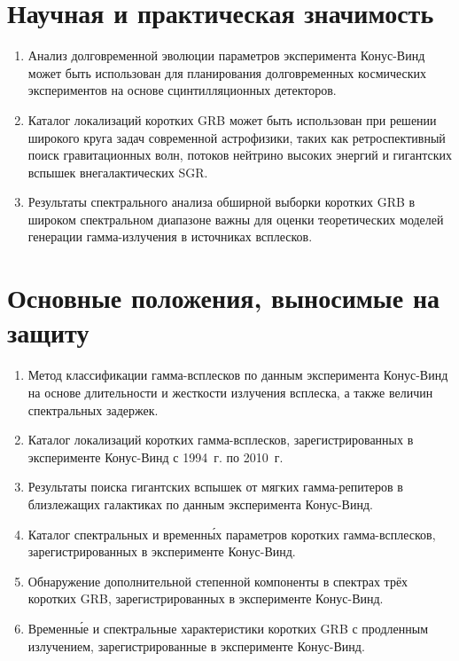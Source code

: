 \section*{Научная и практическая значимость}

\begin{enumerate}
\item Анализ долговременной эволюции параметров эксперимента Конус-Винд может быть использован
 для планирования долговременных космических экспериментов на основе сцинтилляционных детекторов.
\item Каталог локализаций коротких GRB может быть использован при решении 
 широкого круга задач современной астрофизики, таких как ретроспективный поиск гравитационных волн, потоков 
 нейтрино высоких энергий и гигантских вспышек внегалактических SGR.
\item Результаты спектрального анализа обширной выборки коротких GRB 
 в широком спектральном диапазоне важны для оценки теоретических 
 моделей генерации гамма-излучения в источниках всплесков.
\end{enumerate}

\section*{Основные положения, выносимые на защиту}

\begin{enumerate}
\item Метод классификации гамма-всплесков по данным эксперимента Конус-Винд на основе
    длительности и жесткости излучения всплеска, а также величин спектральных задержек.
\item Каталог локализаций коротких гамма-всплесков, зарегистрированных в эксперименте
    Конус-Винд с 1994~г. по 2010~г.
\item Результаты поиска гигантских вспышек от мягких гамма-репитеров 
    в близлежащих галактиках по данным эксперимента Конус-Винд. 
\item Каталог спектральных и временн\'{ы}х параметров коротких гамма-всплесков, 
    зарегистрированных в эксперименте Конус-Винд.
\item Обнаружение дополнительной степенной компоненты в спектрах трёх коротких GRB, 
    зарегистрированных в эксперименте Конус-Винд.
\item Временн\'{ы}е и спектральные характеристики коротких GRB 
    с продленным излучением, зарегистрированные в эксперименте Конус-Винд.
\end{enumerate}


